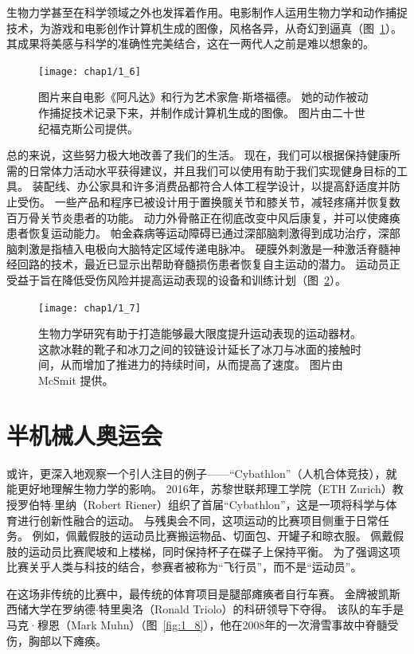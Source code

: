 生物力学甚至在科学领域之外也发挥着作用。电影制作人运用生物力学和动作捕捉技术，为游戏和电影创作计算机生成的图像，风格各异，从奇幻到逼真（图~\ref{fig:1_6}）。
其成果将美感与科学的准确性完美结合，这在一两代人之前是难以想象的。


\begin{figure}[!htb]
	\centering
	\texttt{[image: chap1/1\_6]}
	\caption{图片来自电影《阿凡达》和行为艺术家詹$\cdot$斯塔福德。
		她的动作被动作捕捉技术记录下来，并制作成计算机生成的图像。
		图片由二十世纪福克斯公司提供。 \label{fig:1_6}}
\end{figure}


总的来说，这些努力极大地改善了我们的生活。
现在，我们可以根据保持健康所需的日常体力活动水平获得建议，并且我们可以使用有助于我们实现健身目标的工具。
装配线、办公家具和许多消费品都符合人体工程学设计，以提高舒适度并防止受伤。
一些产品和程序已被设计用于置换髋关节和膝关节，减轻疼痛并恢复数百万骨关节炎患者的功能。
动力外骨骼正在彻底改变中风后康复，并可以使瘫痪患者恢复运动能力。
帕金森病等运动障碍已通过深部脑刺激得到成功治疗，深部脑刺激是指植入电极向大脑特定区域传递电脉冲。
硬膜外刺激是一种激活脊髓神经回路的技术，最近已显示出帮助脊髓损伤患者恢复自主运动的潜力。
运动员正受益于旨在降低受伤风险并提高运动表现的设备和训练计划（图~\ref{fig:1_7}）。


\begin{figure}[!htb]
	\centering
	\texttt{[image: chap1/1\_7]}
	\caption{生物力学研究有助于打造能够最大限度提升运动表现的运动器材。
		这款冰鞋的靴子和冰刀之间的铰链设计延长了冰刀与冰面的接触时间，从而增加了推进力的持续时间，从而提高了速度。
		图片由 McSmit 提供。 \label{fig:1_7}}
\end{figure}



\section{半机械人奥运会}


或许，更深入地观察一个引人注目的例子——“Cybathlon”（人机合体竞技），就能更好地理解生物力学的影响。
2016年，苏黎世联邦理工学院（ETH Zurich）教授罗伯特$\cdot$里纳（Robert Riener）组织了首届“Cybathlon”，这是一项将科学与体育进行创新性融合的运动。
与残奥会不同，这项运动的比赛项目侧重于日常任务。
例如，佩戴假肢的运动员比赛搬运物品、切面包、开罐子和晾衣服。
佩戴假肢的运动员比赛爬坡和上楼梯，同时保持杯子在碟子上保持平衡。
为了强调这项比赛关乎人类与科技的结合，参赛者被称为“飞行员”，而不是“运动员”。


在这场非传统的比赛中，最传统的体育项目是腿部瘫痪者自行车赛。
金牌被凯斯西储大学在罗纳德$\cdot$特里奥洛（Ronald Triolo）的科研领导下夺得。
该队的车手是马克·穆恩（Mark Muhn）（图~\ref{fig:1_8}），他在2008年的一次滑雪事故中脊髓受伤，胸部以下瘫痪。


